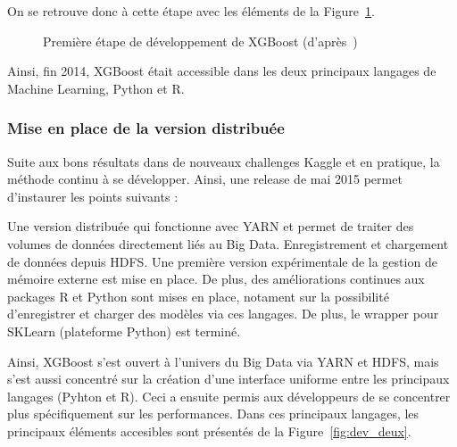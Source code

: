 On se retrouve donc à cette étape avec les éléments de la Figure~\ref{fig:dev_un}.

\begin{figure}[h]
	\begin{margincap}
		\centering
	  	\resizebox{.98\textwidth}{!}{%
		}
		\caption{Première étape de développement de XGBoost (d'après~\cite{bib:xgboost-author})}
		\label{fig:dev_un}
	\end{margincap}
\end{figure}

Ainsi, fin 2014, XGBoost était accessible dans les deux principaux langages de Machine Learning, Python et R.

\subsubsection{Mise en place de la version distribuée}
Suite aux bons résultats dans de nouveaux challenges Kaggle et en pratique, la méthode continu à se développer. Ainsi, une release de mai 2015 permet d'instaurer les points suivants :\begin{itemize}
	Une version distribuée qui fonctionne avec YARN et permet de traiter des volumes de données directement liés au Big Data.
	Enregistrement et chargement de données depuis HDFS.
	Une première version expérimentale de la gestion de mémoire externe est mise en place.
	De plus, des améliorations continues aux packages R et Python sont mises en place, notament sur la possibilité d'enregistrer et charger des modèles via ces langages. De plus, le wrapper pour SKLearn (plateforme Python) est terminé.
\end{itemize}
Ainsi, XGBoost s'est ouvert à l'univers du Big Data via YARN et HDFS, mais s'est aussi concentré sur la création d'une interface uniforme entre les principaux langages (Pyhton et R). Ceci a ensuite permis aux développeurs de se concentrer plus spécifiquement sur les performances. Dans ces principaux langages, les principaux éléments accesibles sont présentés de la Figure~\ref{fig:dev_deux}.

